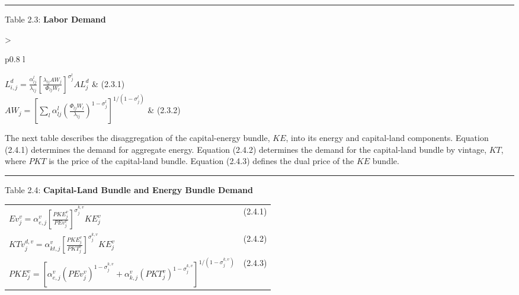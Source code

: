 \documentclass{article}
\begin{document}
\noindent\rule{\linewidth}{0.4pt}
\begin{center}
\begin{large}
{\centering Table 2.3: \textbf{Labor Demand
} \par}

\begin{tabular}{>{\raggedright}p{0.8\textwidth} l}

$L^d_{i,j} = \frac{\alpha^l_{lj}}{\lambda_{lj}} \left[\frac{\lambda_{lj}AW_j}{\Phi_{lj}W_l}\right]^{\sigma^l_j} AL^d_j$ & (2.3.1)\\[15pt]

$AW_j = \left[\displaystyle \sum_l \alpha^l_{lj} \left(\frac{\Phi_{lj}W_l}{\lambda_{lj}}\right)^{1-{\sigma^l_j}} \right]^{1/(1-{\sigma^l_j})}$ & (2.3.2)\\[15pt]

\hline
\end{tabular}
\end{large}
\end{center}

\newpage

The next table describes the disaggregation of the capital-energy bundle, $KE$, into its energy and capital-land components. Equation (2.4.1) determines the demand for aggregate energy. Equation (2.4.2) determines the demand for the capital-land bundle by vintage, $KT$, where $PKT$ is the price of the capital-land bundle. Equation (2.4.3) defines the dual price of the $KE$ bundle.

\noindent\rule{\linewidth}{0.4pt}
\begin{center}
\begin{large}

{\centering Table 2.4: \textbf{Capital-Land Bundle and Energy Bundle Demand
} \par}

\begin{tabular}{>{\raggedright}p{} l}

$Ev^v_j = \alpha^v_{e,j} \left[\frac {PKE^v_j} {PEv^v_j} \right]^{\sigma^{k,v}_j} KE^v_j$ & (2.4.1)\\

$KTv^{d,v}_j = \alpha^v_{kt,j} \left[\frac {PKE^v_j} {PKT^v_j} \right]^{\sigma^{k,v}_j} K\!E^v_j$ & (2.4.2)\\

{\normalsize$PKE^v_j = \left [\alpha^v_{e,j} \left(PEv^v_j \right)^{1-{\sigma^{k,v}_j}} + \alpha^v_{k,j} \left(PKT^v_j \right)^{1-{\sigma^{k,v}_j}}\right]^{1/(1-{\sigma^{k,v}_j})} $} & (2.4.3)\\[15pt]

\hline
\end{tabular}
\end{large}
\end{center}
\end{document}
